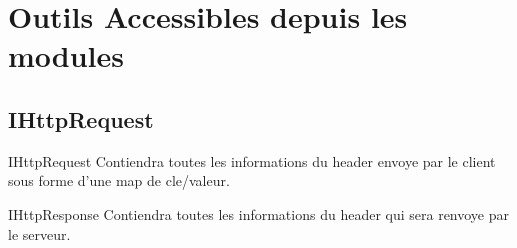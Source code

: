   \chapter{Outils Accessibles depuis les modules}
  \section{IHttpRequest}
    \begin{figure}[h!]
    \end{figure}

    IHttpRequest Contiendra toutes les informations du header envoye par le client sous forme d'une map de cle/valeur.

    \begin{figure}[h!]
    \end{figure}

    \newpage

    IHttpResponse Contiendra toutes les informations du header qui sera renvoye par le serveur.

